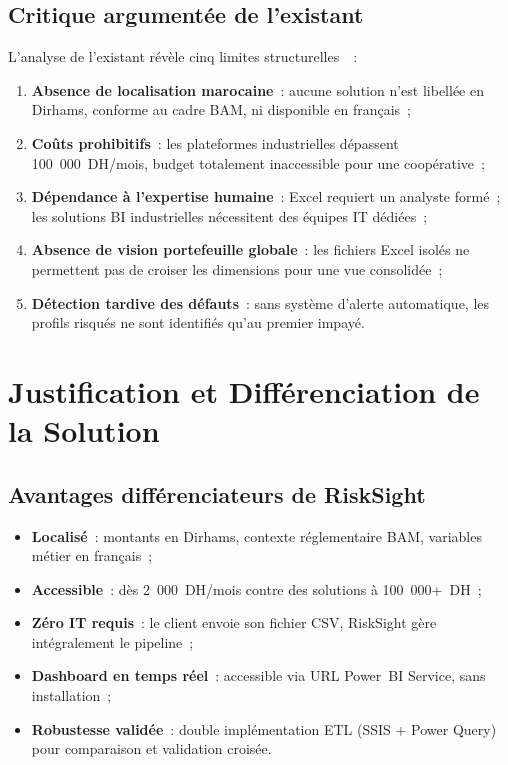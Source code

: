\documentclass[12pt, a4paper]{report}
\begin{document}
\subsection{Critique argumentée de l'existant}

L'analyse de l'existant révèle cinq limites structurelles~\cite{tp3_faisabilite}~:

\begin{enumerate}[leftmargin=1.5em]
  \item \textbf{Absence de localisation marocaine}~: aucune solution n'est libellée
    en Dirhams, conforme au cadre BAM, ni disponible en français~;
  \item \textbf{Coûts prohibitifs}~: les plateformes industrielles dépassent
    100~000~DH/mois, budget totalement inaccessible pour une coopérative~;
  \item \textbf{Dépendance à l'expertise humaine}~: Excel requiert un analyste
    formé~; les solutions BI industrielles nécessitent des équipes IT dédiées~;
  \item \textbf{Absence de vision portefeuille globale}~: les fichiers Excel
    isolés ne permettent pas de croiser les dimensions pour une vue consolidée~;
  \item \textbf{Détection tardive des défauts}~: sans système d'alerte automatique,
    les profils risqués ne sont identifiés qu'au premier impayé.
\end{enumerate}

\section{Justification et Différenciation de la Solution}

\subsection{Avantages différenciateurs de RiskSight}

\begin{tcolorbox}[successbox,title={Valeur ajoutée de RiskSight face à l'existant}]
\begin{itemize}
  \item \textbf{Localisé}~: montants en Dirhams, contexte réglementaire BAM,
    variables métier en français~;
  \item \textbf{Accessible}~: dès 2~000~DH/mois contre des solutions à 100~000+~DH~;
  \item \textbf{Zéro IT requis}~: le client envoie son fichier CSV, RiskSight
    gère intégralement le pipeline~;
  \item \textbf{Dashboard en temps réel}~: accessible via URL Power~BI Service,
    sans installation~;
  \item \textbf{Robustesse validée}~: double implémentation ETL (SSIS + Power Query)
    pour comparaison et validation croisée.
\end{itemize}
\end{tcolorbox}
\end{document}
